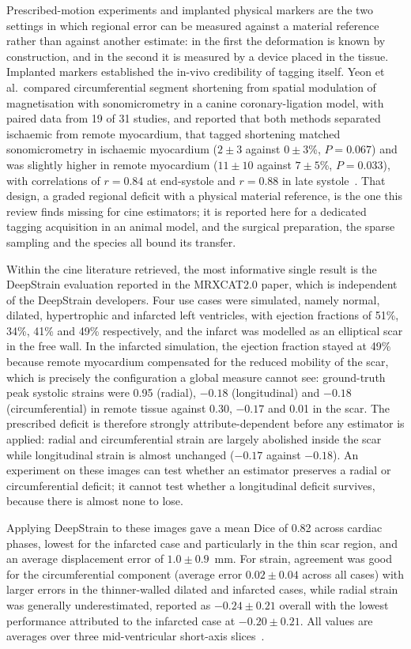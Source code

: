 Prescribed-motion experiments and implanted physical markers are the two settings in which regional
error can be measured against a material reference rather than against another estimate: in the first
the deformation is known by construction, and in the second it is measured by a device placed in the
tissue. Implanted markers established the in-vivo credibility of tagging itself. Yeon et al.\ compared
circumferential segment shortening from spatial modulation of magnetisation with sonomicrometry in a
canine coronary-ligation model, with paired data from 19 of 31 studies, and reported that both methods
separated ischaemic from remote myocardium, that tagged shortening matched sonomicrometry in ischaemic
myocardium ($2\pm3$ against $0\pm3$\%, $P=0.067$) and was slightly higher in remote myocardium
($11\pm10$ against $7\pm5$\%, $P=0.033$), with correlations of $r=0.84$ at end-systole and $r=0.88$ in
late systole~\citep{yeon2001sonomicrometry}. That design, a graded regional deficit with a physical
material reference, is the one this review finds missing for cine estimators; it is reported here for a
dedicated tagging acquisition in an animal model, and the surgical preparation, the sparse sampling and
the species all bound its transfer.

Within the cine literature retrieved, the most informative single result is the DeepStrain
evaluation reported in the MRXCAT2.0 paper, which is independent of the DeepStrain developers. Four
use cases were simulated, namely normal, dilated, hypertrophic and infarcted left ventricles, with
ejection fractions of 51\%, 34\%, 41\% and 49\% respectively, and the infarct was modelled as an
elliptical scar in the free wall. In the infarcted simulation, the
ejection fraction stayed at 49\% because remote myocardium compensated for the reduced mobility of
the scar, which is precisely the configuration a global measure cannot see: ground-truth peak
systolic strains were 0.95 (radial), $-0.18$ (longitudinal) and $-0.18$ (circumferential) in remote
tissue against 0.30, $-0.17$ and 0.01 in the scar. The prescribed deficit is therefore strongly
attribute-dependent before any estimator is applied: radial and circumferential strain are largely
abolished inside the scar while longitudinal strain is almost unchanged ($-0.17$ against $-0.18$).
An experiment on these images can test whether an estimator preserves a radial or circumferential
deficit; it cannot test whether a longitudinal deficit survives, because there is almost none to
lose.

Applying DeepStrain to these images gave a mean Dice of 0.82 across cardiac phases, lowest for the
infarcted case and particularly in the thin scar region, and an average displacement error of
$1.0\pm0.9$~mm. For strain, agreement was good for the circumferential component (average error
$0.02\pm0.04$ across all cases) with larger errors in the thinner-walled dilated and infarcted
cases, while radial strain was generally underestimated, reported as $-0.24\pm0.21$ overall with the
lowest performance attributed to the infarcted case at $-0.20\pm0.21$. All values
are averages over three mid-ventricular short-axis slices~\citep{mrxcat2023}.

